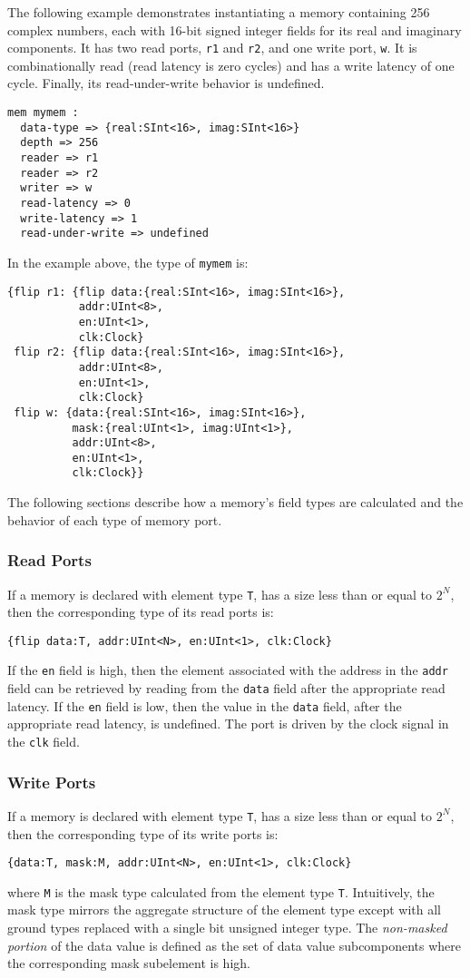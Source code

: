 \documentclass[12pt]{article}
\begin{document}
The following example demonstrates instantiating a memory containing 256 complex numbers, each with 16-bit signed integer fields for its real and imaginary components. It has two read ports, \verb|r1| and \verb|r2|, and one write port, \verb|w|. It is combinationally read (read latency is zero cycles) and has a write latency of one cycle. Finally, its read-under-write behavior is undefined.
\begin{verbatim}
mem mymem :
  data-type => {real:SInt<16>, imag:SInt<16>}
  depth => 256
  reader => r1
  reader => r2
  writer => w
  read-latency => 0
  write-latency => 1
  read-under-write => undefined
\end{verbatim}

In the example above, the type of \verb|mymem| is:
\begin{verbatim}
{flip r1: {flip data:{real:SInt<16>, imag:SInt<16>}, 
           addr:UInt<8>, 
           en:UInt<1>, 
           clk:Clock}
 flip r2: {flip data:{real:SInt<16>, imag:SInt<16>}, 
           addr:UInt<8>, 
           en:UInt<1>, 
           clk:Clock}
 flip w: {data:{real:SInt<16>, imag:SInt<16>}, 
          mask:{real:UInt<1>, imag:UInt<1>}, 
          addr:UInt<8>, 
          en:UInt<1>, 
          clk:Clock}}
\end{verbatim}

The following sections describe how a memory's field types are calculated and the behavior of each type of memory port.

\subsubsection{Read Ports}
If a memory is declared with element type \verb|T|, has a size less than or equal to $2^N$, then the corresponding type of its read ports is:
\begin{verbatim}
{flip data:T, addr:UInt<N>, en:UInt<1>, clk:Clock}
\end{verbatim}

If the \verb|en| field is high, then the element associated with the address in the \verb|addr| field can be retrieved by reading from the \verb|data| field after the appropriate read latency. If the \verb|en| field is low, then the value in the \verb|data| field, after the appropriate read latency, is undefined. The port is driven by the clock signal in the \verb|clk| field.

\subsubsection{Write Ports}
If a memory is declared with element type \verb|T|, has a size less than or equal to $2^N$, then the corresponding type of its write ports is:
\begin{verbatim}
{data:T, mask:M, addr:UInt<N>, en:UInt<1>, clk:Clock}
\end{verbatim}
where \verb|M| is the mask type calculated from the element type \verb|T|. Intuitively, the mask type mirrors the aggregate structure of the element type except with all ground types replaced with a single bit unsigned integer type. The {\em non-masked portion} of the data value is defined as the set of data value subcomponents where the corresponding mask subelement is high.
\end{document}

